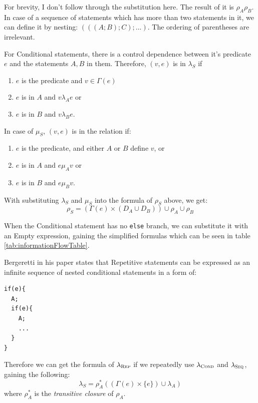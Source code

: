 \documentclass[oneside,12pt,a4paper]{book}
\begin{document}
For brevity, I don't follow through the substitution here. The result of it is $\rho_A\rho_B$. 
In case of a sequence of statements which has more than two statements in it, we can define it by nesting: $(((A;B);C);...)$. The ordering of parentheses are irrelevant.

For Conditional statements, there is a control dependence between it's predicate $e$ and the statements $A,B$ in them. Therefore,
$(v,e)$ is in $\lambda_S$ if
\begin{enumerate}
\item $e$ is the predicate and $v \in \Gamma(e)$
\item $e$ is in $A$ and $v \lambda_A e$ or
\item $e$ is in $B$ and $v \lambda_B e$.
\end{enumerate}

In case of $\mu_S$, $(v,e)$ is in the relation if:
\begin{enumerate}
\item $e$ is the predicate, and either $A$ or $B$ define $v$, or
\item $e$ is in $A$ and $e \mu_A v$ or
\item $e$ is in $B$ and $e \mu_B v$.
\end{enumerate}

With substituting $\lambda_S$ and $\mu_S$ into the formula of $\rho_S$ above, we get:
\begin{equation}
\rho_S = (\Gamma(e) \times (D_A \cup D_B)) \cup \rho_A \cup \rho_B
\end{equation}

When the Conditional statement has no \texttt{else} branch, we can substitute it with an Empty expression, gaining the simplified formulas which can be seen in table \ref{tab:informationFlowTable}.

Bergeretti in his paper states that Repetitive statements can be expressed as an infinite sequence of nested conditional  statements in a form of:
\begin{lstlisting}
if(e){
  A;
  if(e){
    A;
    ...
  }
}
\end{lstlisting}

Therefore we can get the formula of $\lambda_{\textsc{Rep}}$ if we repeatedly use $\lambda_{\textsc{Cond}}$ and $\lambda_{\textsc{Seq}}$, gaining the following:
\begin{equation}
\lambda_S = \rho^*_A((\Gamma(e) \times \{e\}) \cup \lambda_A)
\end{equation}
where $\rho^*_A$ is the \textit{transitive closure} of $\rho_A$.
\end{document}
